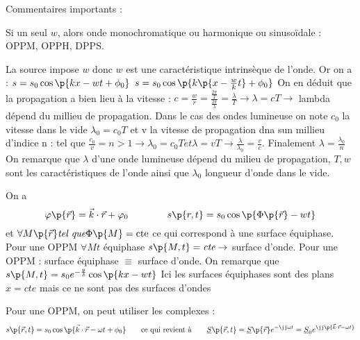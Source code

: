     Commentaires importants :
    \begin{psse}
        \item Si un seul $w$, alors onde monochromatique ou harmonique ou sinusoïdale : OPPM, OPPH, DPPS.
        
        \item La source impose $w$ donc $w$ est une caractéristique intrinsèque de l'onde.
    Or on a : $s = s_0 \cos \p{k x - w t + \phi_0}$
    $s = s_0\cos\p{k\p{x - \frac{w}{k}t} + \phi_0}$
    On en déduit que la propagation a bien lieu à la vitesse : $c = \frac{w}{r} = \frac{\frac{2\pi}{T}}{\frac{2\pi}{\lambda}} = \frac{\lambda}{T} \to \lambda = c T \to$ lambda dépend du millieu de propagation.
    Dans le cas des ondes lumineuse on note $c_0$ la vitesse dans le vide $\lambda_0 = c_0 T$ et v la vitesse de propagation dna sun millieu d'indice n : tel que $\frac{c_0}{v} = n > 1 \to \lambda_0 = c_0 T \textit{et} \lambda = v T \to \frac{\lambda}{\lambda_0} = \frac{v}{c}$. Finalement $\lambda = \frac{\lambda_0}{n}$
    On remarque que $\lambda$ d'une onde lumineuse dépend du milieu de propagation, $T, w$ sont les caractéristiques de l'onde ainsi que $\lambda_0$ longueur d'onde dans le vide.
    
        \item On a 
        \[\varphi\p{\vec r} = \vec k \cdot \vec r + \varphi_0 \qquad\qquad s\p{r, t} = s_0\cos\p{\Phi\p{\vec r} - w t}\]
        et $\forall M\p{\vec r} \textit{tel que} \Phi\p{M} = \text{cte}$ ce qui correspond à une surface équiphase.
        Pour une OPPM $\forall M t$ équiphase $s\p{M, t} = \textit{cte} \to$ surface d'onde. Pour une OPPM : surface équiphase $\equiv$ surface d'onde.
    On remarque que $s\p{M, t} = s_0 e^{-\frac{y}{\delta}}\cos\p{kx - wt}$
    Ici les surfaces équiphases sont des plans $x = \textit{cte}$ mais ce ne sont pas des surfaces d'ondes
    
    
        \item Pour une OPPM, on peut utiliser les complexes :
        \[ s\p{\vec r, t} = s_0\cos\p{\vec k \cdot \vec r -\omega t + \phi_0} \qquad\text{ce qui revient à}\qquad \underline S\p{\vec r, t} = \underline S\p{\vec r}e^{-\jj \omega t} = \underline S_0 e^{\jj\p{\vec k \cdot \vec r - \omega t}}\]
        


\end{psse}
